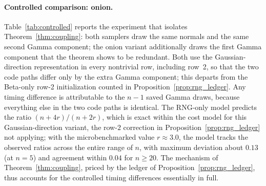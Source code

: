 \documentclass[12pt,english]{article}
\theoremstyle{plain} %
\theoremstyle{definition} %
\theoremstyle{remark} %
\begin{document}
\paragraph{Controlled comparison: onion.}
Table~\ref{tab:controlled} reports the experiment that isolates Theorem~\ref{thm:coupling}: both samplers draw the same normals and the same second Gamma component; the onion variant additionally draws the first Gamma component that the theorem shows to be redundant. Both use the Gaussian-direction representation in every nontrivial row, including row~2, so that the two code paths differ only by the extra Gamma component; this departs from the Beta-only row-2 initialization counted in Proposition~\ref{prop:rng_ledger}. Any timing difference is attributable to the $n-1$ saved Gamma draws, because everything else in the two code paths is identical. The RNG-only model predicts the ratio $(n+4r)/(n+2r)$, which is exact within the cost model for this Gaussian-direction variant, the row-$2$ correction in Proposition~\ref{prop:rng_ledger} not applying; with the microbenchmarked value $r\approx3.0$, the model tracks the observed ratios across the entire range of $n$, with maximum deviation about $0.13$ (at $n=5$) and agreement within $0.04$ for $n\geq20$. The mechanism of Theorem~\ref{thm:coupling}, priced by the ledger of Proposition~\ref{prop:rng_ledger}, thus accounts for the controlled timing differences essentially in full.
\end{document}
